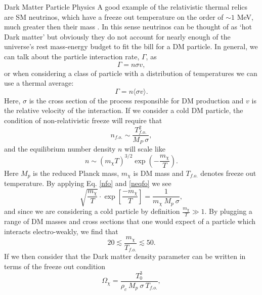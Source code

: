 \documentclass[a4paper,11pt]{article}
\begin{document}
\begin{section}{Dark Matter Particle Physics}
    A good example of the relativistic thermal relics are SM neutrinos, which have a freeze out temperature on the order of $\sim 1$ MeV, much greater then their mass \cite{Profumo}.
    In this sense neutrinos can be thought of as `hot Dark matter' but obviously they do not account for nearly enough of the universe's rest mass-energy budget to fit the bill for a DM particle.
    In general, we can talk about the particle interaction rate, $\Gamma$, as
    \begin{equation}
        \Gamma = n\sigma v,
    \end{equation}
    or when considering a class of particle with a distribution of temperatures we can use a thermal average:
    \begin{equation}
        \Gamma = n\langle\sigma v\rangle.
    \end{equation}
    Here, $\sigma$ is the cross section of the process responsible for DM production and $v$ is the relative velocity of the interaction.
    If we consider a cold DM particle, the condition of non-relativistic freeze will require that
    \begin{equation}
        n_{f.o.} \sim \frac{T_{f.o.}^{2}}{M_{P} ~ \sigma},
        \label{nfo}
    \end{equation}
    and the equilibrium number density $n$ will scale like
    \begin{equation}
        n \sim\left(m_{\chi} T\right)^{3 / 2} \exp \left(-\frac{m_{\chi}}{T}\right).
        \label{neqfo}
    \end{equation}
    Here $M_p$ is the reduced Planck mass, $m_\chi$ is DM mass and $T_{f.o.}$ denotes freeze out temperature.
    By applying Eq. \ref{nfo} and \ref{neqfo} we see
    \begin{equation}
        \sqrt{\frac{m_\chi}{T}} \cdot \exp\left[\frac{-m_\chi}{T}\right]=\frac{1}{m_{\chi} ~ M_{p} ~ \sigma},
    \end{equation}
    and since we are considering a cold particle by definition $\frac{m_\chi}{T} \gg 1$.
    By plugging a range of DM masses and cross sections that one would expect of a particle which interacts electro-weakly, we find that
    \begin{equation}
        20 \lesssim \frac{m_\chi}{T_{f.o.}} \lesssim 50.
    \end{equation}
    If we then consider that the Dark matter density parameter can be written in terms of the freeze out condition
    \begin{equation}
        \Omega_\chi = \frac{T_0^3}{\rho_c ~ M_p ~ \sigma ~T_{f.o.}},

\end{equation}
\end{section}
\end{document}
